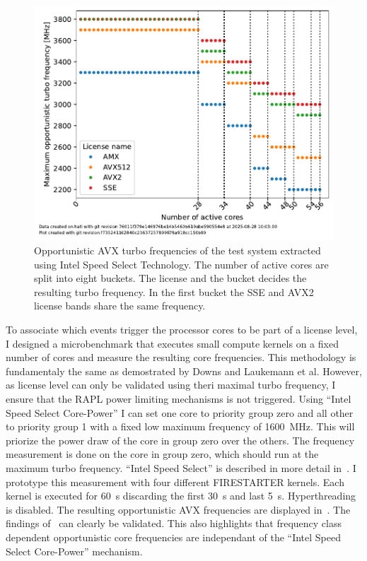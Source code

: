 \begin{figure}[]
    \centering
    \includegraphics[width=0.8\columnwidth]{fig/avx-frequency-license-bands/avx-frequency-license-bands.pdf}
    \caption{\label{fig:p0n-frequencies}Opportunistic AVX turbo frequencies of the test system extracted using Intel Speed Select Technology.
    The number of active cores are split into eight buckets. The license and the bucket decides the resulting turbo frequency.
    In the first bucket the SSE and AVX2 license bands share the same frequency.}
\end{figure}


To associate which events trigger the processor cores to be part of a license level, I designed a microbenchmark that executes small compute kernels on a fixed number of cores and measure the resulting core frequencies.
This methodology is fundamentaly the same as demostrated by Downs and Laukemann et al.
However, as license level can only be validated using theri maximal turbo frequency,
I ensure that the RAPL power limiting mechanisms is not triggered.
Using ``Intel Speed Select Core-Power'' I can set one core to priority group zero and all other to priority group 1 with a fixed low maximum frequency of \SI{1600}{\MHz}.
This will priorize the power draw of the core in group zero over the others.
The frequency measurement is done on the core in group zero, which should run at the maximum turbo frequency.
``Intel Speed Select'' is described in more detail in~.
I prototype this measurement with four different FIRESTARTER kernels.
Each kernel is executed for \SI{60}{\s} discarding the first \SI{30}{\s} and last \SI{5}{\s}.
Hyperthreading is disabled.
The resulting opportunistic AVX frequencies are displayed in~.
The findings of~ can clearly be validated.
This also highlights that frequency class dependent opportunistic core frequencies are independant of the ``Intel Speed Select Core-Power'' mechanism.

